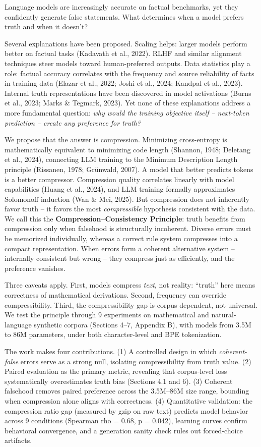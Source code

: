 \documentclass[
  11pt,
]{article}
\newcounter{none} %
\begin{document}
Language models are increasingly accurate on factual benchmarks, yet
they confidently generate false statements. What determines when a model
prefers truth and when it doesn't?

Several explanations have been proposed. Scaling helps: larger models
perform better on factual tasks (Kadavath et al., 2022). RLHF and
similar alignment techniques steer models toward human-preferred
outputs. Data statistics play a role: factual accuracy correlates with
the frequency and source reliability of facts in training data (Elazar
et al., 2022; Joshi et al., 2024; Kandpal et al., 2023). Internal truth
representations have been discovered in model activations (Burns et al.,
2023; Marks \& Tegmark, 2023). Yet none of these explanations address a
more fundamental question: \emph{why would the training objective itself
-- next-token prediction -- create any preference for truth?}

We propose that the answer is compression. Minimizing cross-entropy is
mathematically equivalent to minimizing code length (Shannon, 1948;
Deletang et al., 2024), connecting LLM training to the Minimum
Description Length principle (Rissanen, 1978; Grünwald, 2007). A model
that better predicts tokens is a better compressor. Compression quality
correlates linearly with model capabilities (Huang et al., 2024), and
LLM training formally approximates Solomonoff induction (Wan \& Mei,
2025). But compression does not inherently favor truth -- it favors the
most \emph{compressible} hypothesis consistent with the data. We call
this the \textbf{Compression--Consistency Principle}: truth benefits
from compression only when falsehood is structurally incoherent. Diverse
errors must be memorized individually, whereas a correct rule system
compresses into a compact representation. When errors form a coherent
alternative system -- internally consistent but wrong -- they compress
just as efficiently, and the preference vanishes.

Three caveats apply. First, models compress \emph{text}, not reality:
``truth'' here means correctness of mathematical derivations. Second,
frequency can override compressibility. Third, the compressibility gap
is corpus-dependent, not universal. We test the principle through 9
experiments on mathematical and natural-language synthetic corpora
(Sections 4--7, Appendix B), with models from 3.5M to 86M parameters,
under both character-level and BPE tokenization.

The work makes four contributions. (1) A controlled design in which
\emph{coherent-false} errors serve as a strong null, isolating
compressibility from truth value. (2) Paired evaluation as the primary
metric, revealing that corpus-level loss systematically overestimates
truth bias (Sections 4.1 and 6). (3) Coherent falsehood removes paired
preference across the 3.5M--86M size range, bounding when compression
alone aligns with correctness. (4) Quantitative validation: the
compression ratio gap (measured by gzip on raw text) predicts model
behavior across 9 conditions (Spearman rho = 0.68, p = 0.042), learning
curves confirm behavioral convergence, and a generation sanity check
rules out forced-choice artifacts.
\end{document}
